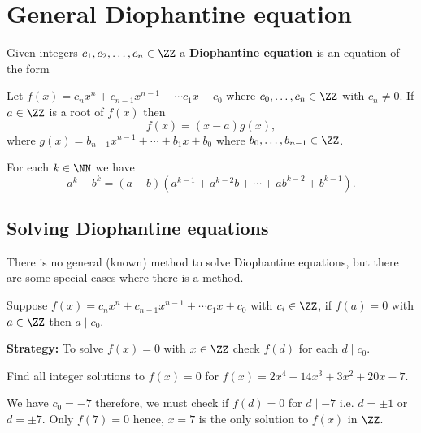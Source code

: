 \documentclass[12pt, a4paper]{article}
\begin{document}
\section{General Diophantine equation}

\begin{definition}
    Given integers \(c_1,c_2,\ldots,c_n \in \ZZ\) a \textbf{Diophantine equation} is an equation of the form
\end{definition}

\begin{proposition}
    Let \(f(x)=c_n x^n + c_{n-1} x^{n-1}+ \cdots c_1 x + c_0\) where \(c_0, \ldots, c_n \in \ZZ\) with \(c_n \neq 0\). If \(a \in \ZZ\) is a root of \(f(x)\) then
    \[f(x)=(x-a)g(x),\]
    where \(g(x)=b_{n-1} x^{n-1}+\cdots +b_1 x +b_0\) where \(b_0,\ldots, b_{n-1} \in \ZZ\).
\end{proposition}

\begin{proposition}
    For each \(k \in \NN\) we have 
    \[a^k - b^k = (a-b)(a^{k-1}+a^{k-2} b + \cdots + a b^{k-2} +b^{k-1}).\]
\end{proposition}

\subsection{Solving Diophantine equations}

There is no general (known) method to solve Diophantine equations, but there are some special cases where there is a method.

\begin{mdprop}
    Suppose \(f(x)=c_n x^n + c_{n-1} x^{n-1}+ \cdots c_1 x + c_0\) with \(c_i\in \ZZ\), if \(f(a)=0\) with \(a \in \ZZ\) then \(a \mid c_0\).
\end{mdprop}

\begin{mdnote}
    \textbf{Strategy:} To solve \(f(x)=0\) with \(x \in \ZZ\) check \(f(d)\) for each \(d \mid c_0\).
\end{mdnote}

\begin{example}
    Find all integer solutions to \(f(x)=0\) for \(f(x)=2x^4-14x^3+3x^2+20x-7\).
    \begin{solution}
        We have \(c_0=-7\) therefore, we must check if \(f(d)=0\) for \(d \mid -7\) i.e. \(d=\pm 1\) or \(d= \pm 7\). Only \(f(7)=0\) hence, \(x=7\) is the only solution to \(f(x)\) in \(\ZZ\).
    \end{solution}
\end{example}
\end{document}

